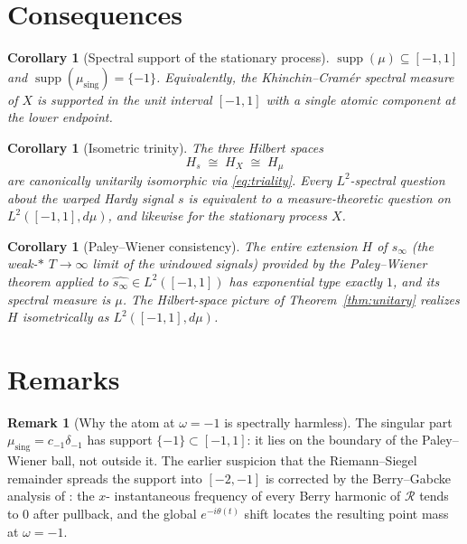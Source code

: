 \documentclass[11pt]{article}
\newtheorem{corollary}[theorem]{Corollary}
\theoremstyle{definition}
\newtheorem{remark}[theorem]{Remark}
\DeclareMathOperator{\supp}{supp}
\begin{document}
\section{Consequences}\label{sec:consequences}

\begin{corollary}[Spectral support of the stationary process]
$\supp(\mu)\subseteq[-1,1]$ and $\supp(\mu_{\mathrm{sing}})=\{-1\}$.
Equivalently, the Khinchin--Cramér spectral measure of $X$ is supported
in the unit interval $[-1,1]$ with a single atomic component at the
lower endpoint.
\end{corollary}

\begin{corollary}[Isometric trinity]\label{cor:trinity}
The three Hilbert spaces
\[
H_{s}\;\cong\;H_{X}\;\cong\;H_{\mu}
\]
are canonically unitarily isomorphic via
\eqref{eq:triality}. Every $L^{2}$-spectral question about the warped
Hardy signal $s$ is equivalent to a measure-theoretic question on
$L^{2}([-1,1],d\mu)$, and likewise for the stationary process $X$.
\end{corollary}

\begin{corollary}[Paley--Wiener consistency]\label{cor:pw}
The entire extension $H$ of $s_{\infty}$ (the weak-$\ast$ $T\to\infty$
limit of the windowed signals) provided by the Paley--Wiener theorem
applied to $\widehat{s_{\infty}}\in L^{2}([-1,1])$ has exponential type
exactly $1$, and its spectral measure is $\mu$. The
Hilbert-space picture of Theorem~\ref{thm:unitary} realizes $H$
isometrically as $L^{2}([-1,1],d\mu)$.
\end{corollary}

\section{Remarks}

\begin{remark}[Why the atom at $\omega=-1$ is spectrally harmless]
The singular part $\mu_{\mathrm{sing}}=c_{-1}\delta_{-1}$ has support
$\{-1\}\subset[-1,1]$: it lies on the boundary of the Paley--Wiener ball,
not outside it. The earlier suspicion that the Riemann--Siegel remainder
spreads the support into $[-2,-1]$ is corrected by the Berry--Gabcke
analysis of \cite[Lemmas~6--7, Proposition~3]{exposition}: the $x$-
instantaneous frequency of every Berry harmonic of $\mathcal{R}$ tends to
$0$ after pullback, and the global $e^{-i\theta(t)}$ shift locates the
resulting point mass at $\omega=-1$.
\end{remark}
\end{document}
